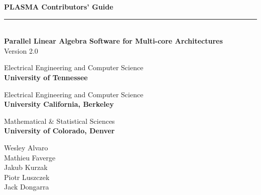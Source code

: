 \documentclass[11pt,letterpaper]{report}
\begin{document}

\thispagestyle{empty}
\begin{flushright}
\sf
\noindent
{\Huge\textbf{PLASMA Contributors' Guide}}
\rule[-1ex]{\textwidth}{5pt}\\[2.5ex]
{\Large\textbf{Parallel Linear Algebra Software for Multi-core Architectures}} \\
\vspace{0.1in}
{\Large{Version 2.0}} \\
\vspace{0.5in}

\noindent
Electrical Engineering and Computer Science \\
\textbf{University of Tennessee}
\vspace{0.2in}

\noindent
Electrical Engineering and Computer Science \\
\textbf{University California, Berkeley}
\vspace{0.2in}

\noindent
Mathematical \& Statistical Sciences \\
\textbf{University of Colorado, Denver}
\vfill %

\noindent
Wesley Alvaro \\
Mathieu Faverge \\
Jakub Kurzak \\
Piotr Luszczek \\
Jack Dongarra
\end{flushright}


\tableofcontents
{}
\pagestyle{fancy}
\setlength\parindent{0in}
\setlength\parskip{0.1in}
\sloppy
\rm













\end{document}

